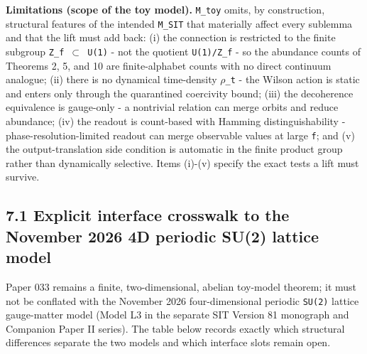 \documentclass[
  american,
  11pt,
  letterpaper,
]{article}
\begin{document}
\textbf{Limitations (scope of the toy model).} \texttt{M\_toy} omits, by construction, structural features of the intended \texttt{M\_SIT} that materially affect every sublemma and that the lift must add back: (i) the connection is restricted to the finite subgroup \texttt{Z\_f\ \ensuremath{\subset}\ U(1)} - not the quotient \texttt{U(1)/Z\_f} - so the abundance counts of Theorems 2, 5, and 10 are finite-alphabet counts with no direct continuum analogue; (ii) there is no dynamical time-density \texttt{\ensuremath{\rho}\_t} - the Wilson action is static and enters only through the quarantined coercivity bound; (iii) the decoherence equivalence is gauge-only - a nontrivial relation can merge orbits and reduce abundance; (iv) the readout is count-based with Hamming distinguishability - phase-resolution-limited readout can merge observable values at large \texttt{f}; and (v) the output-translation side condition is automatic in the finite product group rather than dynamically selective. Items (i)-(v) specify the exact tests a lift must survive.

\subsection{7.1 Explicit interface crosswalk to the November 2026 4D periodic SU(2) lattice model}\label{explicit-interface-crosswalk-to-the-november-2026-4d-periodic-su2-lattice-model}

Paper 033 remains a finite, two-dimensional, abelian toy-model theorem; it must not be conflated with the November 2026 four-dimensional periodic \texttt{SU(2)} lattice gauge-matter model (Model L3 in the separate SIT Version 81 monograph and Companion Paper II series). The table below records exactly which structural differences separate the two models and which interface slots remain open.
\end{document}
